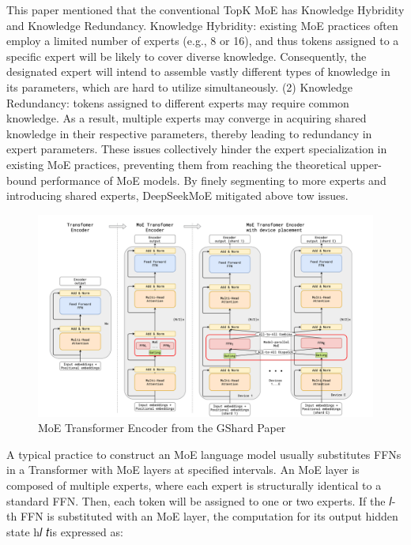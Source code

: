 This paper mentioned that the conventional TopK MoE has Knowledge Hybridity and Knowledge Redundancy. Knowledge Hybridity: existing MoE practices often employ a limited number of experts (e.g., 8 or 16), and thus tokens assigned to a specific expert will be likely to cover diverse knowledge. Consequently, the designated expert will intend to assemble vastly different types of knowledge in its parameters, which are hard to utilize simultaneously. (2) Knowledge Redundancy: tokens assigned to different experts may require common knowledge. As a result, multiple experts may converge in acquiring shared knowledge in their respective parameters, thereby leading to redundancy in expert parameters. These issues collectively hinder the expert specialization in existing MoE practices, preventing them from reaching the theoretical upper-bound performance of MoE models. By finely segmenting to more experts and introducing shared experts, DeepSeekMoE mitigated above tow issues.


\begin{figure}[t]
	\centering
	\includegraphics[scale=0.35]{./images/transformer/moe_block.png}
	\caption{MoE Transformer Encoder from the GShard Paper}
\end{figure}
A typical practice to construct an MoE language model usually substitutes FFNs in a Transformer with MoE layers at specified intervals. An MoE layer is composed of multiple experts, where each expert is structurally identical to a standard FFN. Then, each token will be assigned to one or two experts. If the 𝑙-th FFN is substituted with an MoE layer, the computation for its output hidden state h𝑙 𝑡is expressed as:


